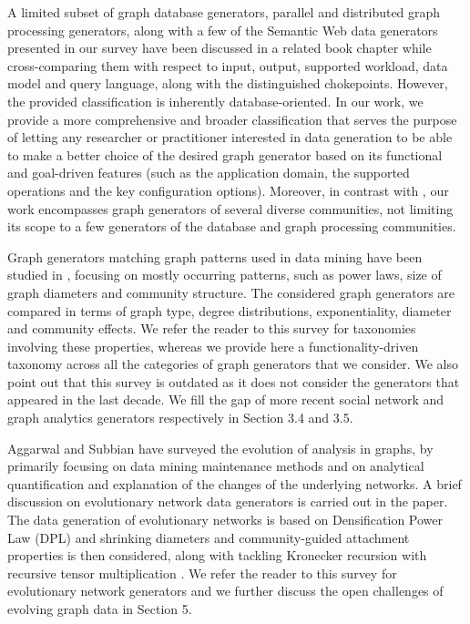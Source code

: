 A limited subset of graph database
generators, parallel and distributed graph processing generators, along
with a few of the Semantic Web data generators presented in our survey have
been discussed in a related book chapter
\cite{BFHI18} while cross-comparing them with respect to input, output,
supported workload, data model and query language, along with the
distinguished chokepoints. However, the provided classification is
inherently database-oriented.
In our work, we provide a more comprehensive and broader classification
 that serves the purpose of letting any
researcher or practitioner interested in data generation  to be able to make a better
choice of the desired graph
generator based on its functional and goal-driven features (such as the application domain,
the supported operations and the key configuration options).
Moreover, in contrast with \cite{BFHI18}, our work encompasses graph generators of several
diverse communities, not limiting its scope to a few generators of the database
and graph processing communities.

Graph generators matching graph patterns used in data mining have been
studied in \cite{Chakrabarti:2006:GML:1132952.1132954},
focusing on mostly occurring patterns, such as power laws, size of graph diameters
and community structure. The considered graph generators are compared in
terms of graph type, degree distributions, exponentiality, diameter and
community effects. We refer the reader to this survey for taxonomies
involving these properties, whereas we provide here a functionality-driven
taxonomy across all the categories of graph generators that we consider.
We also point out that this survey is outdated as it does not consider the
generators that appeared in the last decade.
We fill the gap of more recent social network and graph analytics generators
respectively in Section 3.4 and 3.5.


Aggarwal and Subbian \cite{AggarwalS14} have surveyed the evolution of analysis in
graphs, by primarily focusing on data mining maintenance methods and on analytical
quantification and explanation of the changes of the underlying networks.
A brief discussion on evolutionary
network data generators is carried out in
the paper. The data generation of evolutionary networks is based on
Densification Power Law (DPL) and shrinking diameters and community-guided
attachment properties \cite{Leskovec:2005:GOT:1081870.1081893} is then considered, along with tackling Kronecker
recursion with recursive tensor multiplication \cite{AkogluMF08}.
We refer the reader to this survey for evolutionary network generators and
we further discuss the open challenges of evolving graph data in Section 5.

